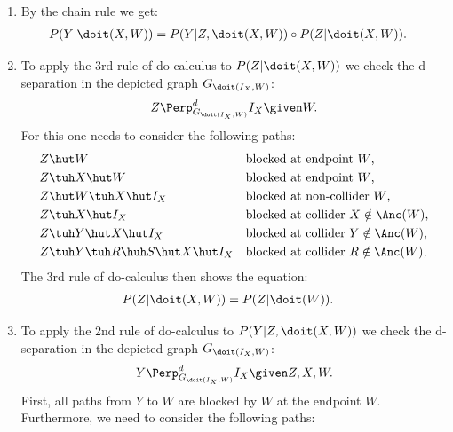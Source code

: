{\begin{enumerate}
    \item By the chain rule we get:
        \begin{align*}
            P(Y|\doit(X,W)) &= P(Y|Z,\doit(X,W)) \circ P(Z|\doit(X,W)).
        \end{align*}
          \item To apply the 3rd rule of do-calculus to $P(Z|\doit(X,W))$ we check the d-separation in the depicted graph $G_{\doit(I_X,W)}$:
         \begin{align*}
             Z \Perp^d_{G_{\doit(I_X,W)}} I_X \given W.
         \end{align*}
         For this one needs to consider the following paths:
         \begin{align*}
             &Z \hut W          && \text{blocked at endpoint $W$,} \\
             &Z \tuh X \hut W   && \text{blocked at endpoint $W$,} \\
             &Z \hut W \tuh X \hut I_X   && \text{blocked at non-collider $W$,} \\
             &Z \tuh X \hut I_X && \text{blocked at collider $X \notin \Anc(W)$,}\\
             &Z \tuh Y \hut X \hut I_X && \text{blocked at collider $Y \notin \Anc(W)$,}\\
             &Z \tuh Y \tuh R \huh S \hut X \hut I_X && \text{blocked at collider $R \notin \Anc(W)$,}
         \end{align*}
         The 3rd rule of do-calculus then shows the equation:
         \begin{align*}
             P(Z|\doit(X,W)) & = P(Z|\doit(W)).
         \end{align*}
     \item To apply the 2nd rule of do-calculus to $P(Y|Z,\doit(X,W))$ we check the d-separation in the depicted graph $G_{\doit(I_X,W)}$: 
         \begin{align*}
             Y \Perp^d_{G_{\doit(I_X,W)}} I_X \given Z,X,W.
         \end{align*}
         First, all paths from $Y$ to $W$ are blocked by $W$ at the endpoint $W$.
         Furthermore, we need to consider the following paths:

\end{enumerate}}
